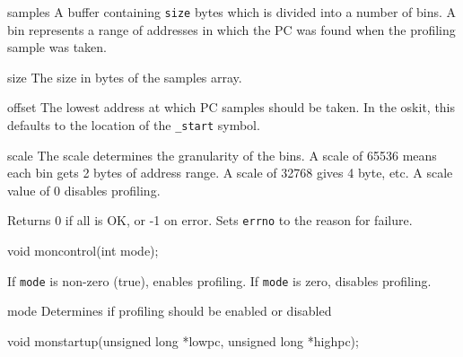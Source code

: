 \begin{apiparm}
	\item[samples]
		A buffer containing {\tt size} bytes which is divided into 
		a number of bins.  A bin represents a range of
		addresses in which the PC was found when the profiling
		sample was taken.

	\item[size]
		The size in bytes of the samples array.

	\item[offset]
		The lowest address at which PC samples should be
		taken.  In the oskit, this defaults to the location
		of the {\tt _start} symbol.

	\item[scale]
		The scale determines the granularity of the bins.
		A scale of 65536 means each bin gets 2 bytes of
		address range.  A scale of 32768 gives 4 byte, etc.
		A scale value of 0 disables profiling.
\end{apiparm}
\begin{apiret}
	Returns 0 if all is OK, or -1 on error.  Sets {\tt errno} to the
	reason for failure.
\end{apiret}

\begin{apisyn}


	\funcproto void moncontrol(int mode);
\end{apisyn}

\begin{apidesc}

If {\tt mode} is non-zero (true), enables profiling.  If {\tt mode} is zero, 
disables profiling.
\end{apidesc}

\begin{apiparm}
\item[mode]  Determines if profiling should be enabled or disabled
\end{apiparm}

\begin{apisyn}


	\funcproto void monstartup(unsigned long *lowpc, unsigned long
				*highpc);
\end{apisyn}

